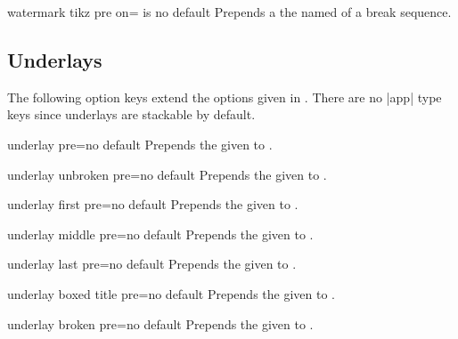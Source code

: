 \begin{docTcbKey}{watermark tikz pre on}{= is }{no default}
  Prepends a  the named  of a break sequence.
\end{docTcbKey}


\clearpage
\subsection{Underlays}
The following option keys extend the options given in .
There are no |app| type keys since underlays are stackable by default.

\begin{docTcbKey}{underlay pre}{=}{no default}
  Prepends the given  to .
\end{docTcbKey}

\begin{docTcbKey}{underlay unbroken pre}{=}{no default}
  Prepends the given  to .
\end{docTcbKey}

\begin{docTcbKey}{underlay first pre}{=}{no default}
  Prepends the given  to .
\end{docTcbKey}

\begin{docTcbKey}{underlay middle pre}{=}{no default}
  Prepends the given  to .
\end{docTcbKey}

\begin{docTcbKey}{underlay last pre}{=}{no default}
  Prepends the given  to .
\end{docTcbKey}

\begin{docTcbKey}{underlay boxed title pre}{=}{no default}
  Prepends the given  to .
\end{docTcbKey}

\begin{docTcbKey}{underlay broken pre}{=}{no default}
  Prepends the given  to .
\end{docTcbKey}

